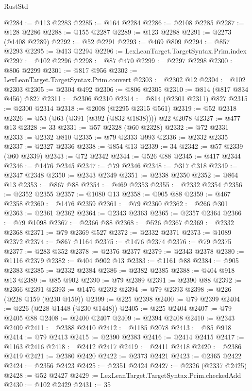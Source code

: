 \begin{lexlean}{RustStd}
\begin{coremodule}
@2284 := @113 @2283
@2285 := @164 @2284
@2286 := @2108 @2285
@2287 := @128 @2286
@2288 := @155 @2287
@2289 := @123 @2288
@2291 := @2273 (@1408 @2289)
@2292 := @52 @2291
@2293 := @469 @809
@2294 := @857 @2293
@2295 := @413 @2294
@2296 := LexLeanTarget.TargetSyntax.Prim.index
@2297 := @102 @2296
@2298 := @87 @470
@2299 := @2297 @2298
@2300 := @806 @2299
@2301 := @817 @956
@2302 := LexLeanTarget.TargetSyntax.Prim.convert
@2303 := @2302 @12
@2304 := @102 @2303
@2305 := @2304 @492
@2306 := @806 @2305
@2310 := @814 (@817 @834 @456) @827
@2311 := @2306 @2310
@2314 := @814 (@2301 @2311) @827
@2315 := @2300 @2314
@2318 := @2008 (@2295 @2315 @561)
@2319 := @52 @2318
@2326 := @53 (@63 (@391 (@392 (@832 @1838)))) @22 @2078
@2327 := @477 @13
@2328 := 33
@2331 := @57 @2328 (@60 @2328)
@2332 := @72 @2331
@2333 := @2332 @810
@2335 := @79 @2333 @993
@2336 := @2332 @2335
@2337 := @2327 @2336
@2338 := @854 @13
@2339 := 34
@2342 := @57 @2339 (@60 @2339)
@2343 := @72 @2342
@2344 := @526 @88
@2345 := @417 @2344
@2346 := @1476 @2345
@2347 := @79 @2346
@2348 := @317 @318
@2349 := @2347 @2348
@2350 := @2343 @2349
@2351 := @2338 @2350
@2352 := @864 @13
@2353 := @867 @88
@2354 := @469 @2353
@2355 := @2332 @2354
@2356 := @2352 @2355
@2357 := @1080 @13
@2358 := @905 @88
@2359 := @467 @2358
@2360 := @1476 @2359
@2361 := @79 @2360
@2362 := @266 @301
@2363 := @2361 @2362
@2364 := @2343 @2363
@2365 := @2357 @2364
@2366 := @79 @1098
@2367 := @2366 @88
@2368 := @526 @2367
@2369 := @2332 @2368
@2371 := @79 @2369 @527
@2372 := @2332 @2371
@2373 := @1089 @2372
@2374 := @867 @1164
@2375 := @1476 @2374
@2376 := @79 @2375
@2377 := @283 @352
@2378 := @2376 @2377
@2379 := @2343 @2378
@2380 := @1116 @2379
@2382 := @404 @902 @13
@2383 := @1161 @88
@2384 := @905 @2383
@2385 := @2332 @2384
@2386 := @2382 @2385
@2388 := @404 @918 @13
@2389 := @85 @902
@2390 := @79 @2389
@2391 := @2390 @88
@2392 := @2366 @2391
@2393 := @1476 @2392
@2394 := @79 @2393
@2398 := @226 (@228 @159 (@230 @159))
@2399 := @225 @2398
@2400 := @79 @2399
@2404 := @226 (@228 @1448 (@230 @1448))
@2405 := @225 @2404
@2407 := @79 @2405 @88
@2408 := @2400 @2407
@2409 := @2394 @2408
@2410 := @2343 @2409
@2411 := @2388 @2410
@2412 := @1185 @2078
@2413 := @85 @918
@2414 := @79 @2413
@2415 := @2390 @2383
@2416 := @2414 @2415
@2417 := @1163 @2416
@2418 := @2412 @2417
@2419 := @2411 @2418
@2420 := @2386 @2419
@2421 := @2380 @2420
@2422 := @2373 @2421
@2423 := @2365 @2422
@2424 := @2356 @2423
@2425 := @2351 @2424
@2427 := @2326 (@2337 @2425)
@2428 := @52 @2427
@2429 := LexLeanTarget.TargetSyntax.Prim.checkedAdd
@2430 := @102 @2429
@2431 := 35

\end{coremodule}
\end{lexlean}

